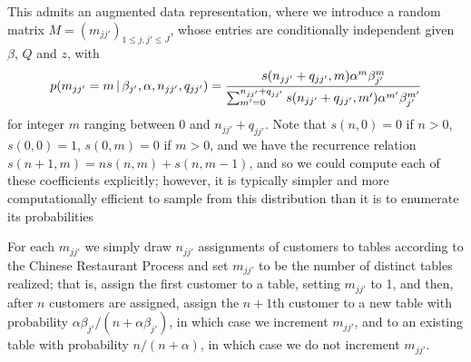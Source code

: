 This admits an augmented data representation, where we introduce a
random matrix $M = (m_{jj'})_{1 \leq j,j' \leq J}$, whose
entries are conditionally independent given $\beta$, $Q$ and $z$, with
\begin{equation}
  \label{eq:32}
  p(m_{jj'} = m \, \vert \, \beta_{j'}, \alpha, n_{jj'}, q_{jj'}) =
  \frac{s(n_{jj'} + q_{jj'}, m) \alpha^{m}
    \beta_{j'}^{m}}{\sum_{m'=0}^{n_{jj'} + q_{jj'}} s(n_{jj'} +
  q_{jj'}, m') \alpha^{m'} \beta_{j'}^{m'}}
\end{equation}
for integer $m$ ranging between $0$ and $n_{jj'} + q_{jj'}$.  Note
that $s(n,0) = 0$ if $n > 0$, $s(0,0) = 1$, $s(0,m) = 0$ if $m >
0$, and we have the recurrence relation $s(n+1,m) = n s(n,m) + s(n,m-1)$, 
and so we could compute each of these coefficients explicitly;
however, it is typically simpler and more computationally efficient to sample from
this distribution than it is to enumerate its probabilities

For each $m_{jj'}$ we simply draw $n_{jj'}$ assignments of customers to tables 
according to the Chinese Restaurant Process and set $m_{jj'}$ to be
the number of distinct tables realized; that is, assign the first
customer to a table, setting $m_{jj'}$ to 1, and then, after $n$
customers are assigned, assign the $n+1$th customer to a new table
with probability $\alpha\beta_{j'} / (n + \alpha\beta_{j'})$, 
in which case we increment $m_{jj'}$, 
and to an existing table with probability $n / (n + \alpha)$, in which
case we do not increment $m_{jj'}$.  



